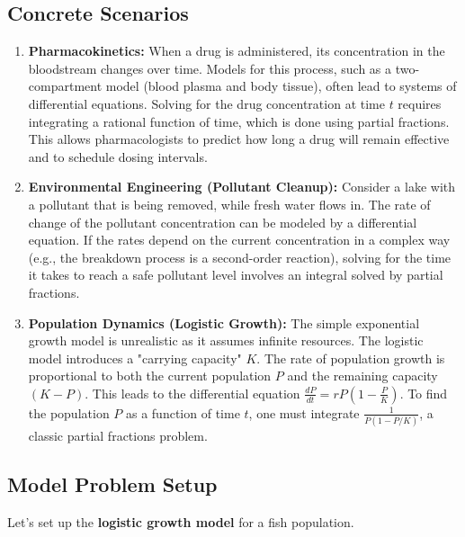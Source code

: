 \documentclass{article}
\begin{document}
\subsection{Concrete Scenarios}
\begin{enumerate}
    \item \textbf{Pharmacokinetics:} When a drug is administered, its concentration in the bloodstream changes over time. Models for this process, such as a two-compartment model (blood plasma and body tissue), often lead to systems of differential equations. Solving for the drug concentration at time $t$ requires integrating a rational function of time, which is done using partial fractions. This allows pharmacologists to predict how long a drug will remain effective and to schedule dosing intervals.
    \item \textbf{Environmental Engineering (Pollutant Cleanup):} Consider a lake with a pollutant that is being removed, while fresh water flows in. The rate of change of the pollutant concentration can be modeled by a differential equation. If the rates depend on the current concentration in a complex way (e.g., the breakdown process is a second-order reaction), solving for the time it takes to reach a safe pollutant level involves an integral solved by partial fractions.
    \item \textbf{Population Dynamics (Logistic Growth):} The simple exponential growth model is unrealistic as it assumes infinite resources. The logistic model introduces a "carrying capacity" $K$. The rate of population growth is proportional to both the current population $P$ and the remaining capacity $(K-P)$. This leads to the differential equation $\frac{dP}{dt} = rP(1-\frac{P}{K})$. To find the population $P$ as a function of time $t$, one must integrate $\frac{1}{P(1-P/K)}$, a classic partial fractions problem.
\end{enumerate}

\subsection{Model Problem Setup}
Let's set up the \textbf{logistic growth model} for a fish population.
\end{document}
